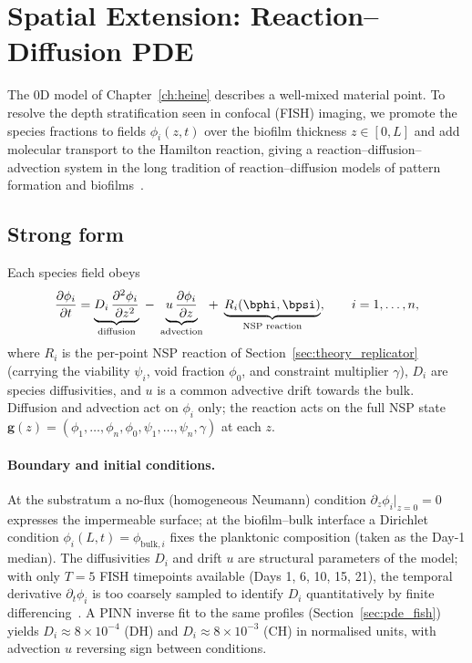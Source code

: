 \section{Spatial Extension: Reaction--Diffusion PDE}
\label{sec:integration_pde}

The $0$D model of Chapter~\ref{ch:heine} describes a well-mixed material point.
To resolve the depth stratification seen in confocal (FISH) imaging, we promote the
species fractions to fields $\phi_i(z,t)$ over the biofilm thickness $z\in[0,L]$ and
add molecular transport to the Hamilton reaction, giving a reaction--diffusion--advection
system in the long tradition of reaction--diffusion models of pattern formation and
biofilms~\cite{Turing1952Morphogenesis, Murray2003MathBiologyII, Kreft2001IbmBiofilm, Ward2003MathBiofilm}.

\subsection{Strong form}
\label{sec:pde_strong}
Each species field obeys
\begin{equation}
  \frac{\partial \phi_i}{\partial t}
  = \underbrace{D_i\,\frac{\partial^2 \phi_i}{\partial z^2}}_{\text{diffusion}}
    \;-\; \underbrace{u\,\frac{\partial \phi_i}{\partial z}}_{\text{advection}}
    \;+\; \underbrace{R_i(\bphi,\bpsi)}_{\text{NSP reaction}},
  \qquad i = 1,\dots,n,
  \label{eq:pde_strong}
\end{equation}
where $R_i$ is the per-point NSP reaction of Section~\ref{sec:theory_replicator}
(carrying the viability $\psi_i$, void fraction $\phi_0$, and constraint multiplier
$\gamma$), $D_i$ are species diffusivities, and $u$ is a common advective drift towards
the bulk. Diffusion and advection act on $\phi_i$ only; the reaction acts on the full NSP
state $\mathbf{g}(z)=(\phi_1,\dots,\phi_n,\phi_0,\psi_1,\dots,\psi_n,\gamma)$ at each $z$.

\paragraph{Boundary and initial conditions.}
At the substratum a no-flux (homogeneous Neumann) condition $\partial_z\phi_i|_{z=0}=0$
expresses the impermeable surface; at the biofilm--bulk interface a Dirichlet condition
$\phi_i(L,t)=\phi_{\mathrm{bulk},i}$ fixes the planktonic composition (taken as the
Day-1 median). The diffusivities $D_i$ and drift $u$ are structural parameters of
the model; with only $T=5$ FISH timepoints available (Days 1, 6, 10, 15, 21),
the temporal derivative $\partial_t\phi_i$ is too coarsely sampled to identify $D_i$
quantitatively by finite differencing~\cite{Stewart1998Diffusion}.
A PINN inverse fit to the same profiles (Section~\ref{sec:pde_fish}) yields
$D_i \approx 8\times10^{-4}$ (DH) and $D_i \approx 8\times10^{-3}$ (CH) in
normalised units, with advection $u$ reversing sign between conditions.

